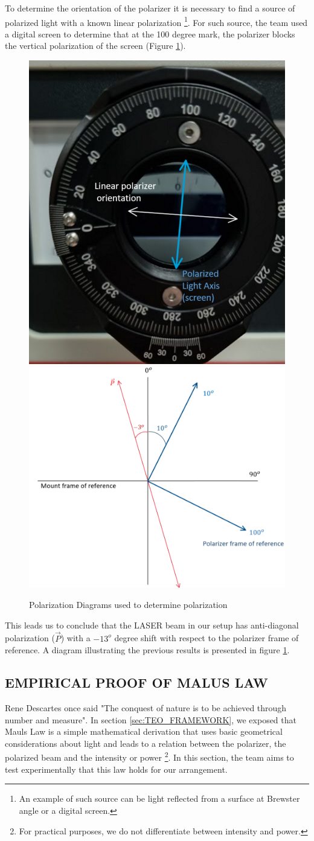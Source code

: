To determine the orientation of the polarizer it is necessary to find a source of polarized light with a known linear polarization \footnote{An example of such source can be light reflected from a surface at Brewster angle or a digital screen. }. For such source, the team used a digital screen to determine that at the 100 degree mark, the polarizer blocks the vertical polarization of the screen (Figure \ref{fig:FOR}). \\

\begin{figure} [H]
    \includegraphics[width=.20 \textwidth]{Figures/Polarization_FrameoRef_Real.png}\hfill
    \includegraphics[width=.26\textwidth]{Figures/Polarization_FrameoRef.png}\hfill

    \caption{Polarization Diagrams used to determine polarization}\label{fig:FOR}
\end{figure}

This leads us to conclude that the LASER beam in our setup has anti-diagonal polarization ($\Vec{P}$) with a $-13^o$ degree shift with respect to the polarizer frame of reference. A diagram illustrating the previous results is presented in figure \ref{fig:FOR}. \\

\subsection{EMPIRICAL PROOF OF MALUS LAW}
Rene Descartes once said "The conquest of nature is to be achieved through number and measure". In section \ref{sec:TEO_FRAMEWORK}, we exposed that Mauls Law is a simple mathematical derivation that uses basic geometrical considerations about  light and leads to a relation between the polarizer, the polarized beam and the intensity or power \footnote{For practical purposes, we do not differentiate between intensity and power.}. In this section, the team aims to test experimentally that this law holds for our arrangement. \\

